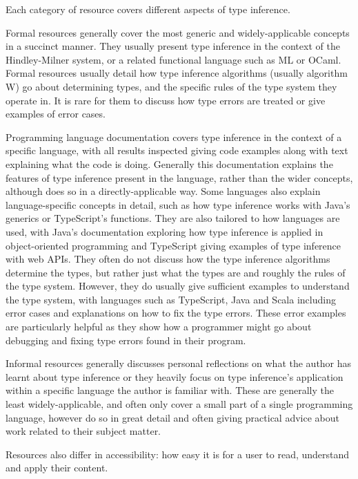 \documentclass[a4paper,fleqn,twoside,12pt]{report}
\begin{document}
Each category of resource covers different aspects of type inference.

Formal resources generally cover the most generic and widely-applicable concepts in a succinct manner. They usually present type inference in the context of the Hindley-Milner system, or a related functional language such as ML or OCaml. Formal resources usually detail how type inference algorithms (usually algorithm W) go about determining types, and the specific rules of the type system they operate in. It is rare for them to discuss how type errors are treated or give examples of error cases.

Programming language documentation covers type inference in the context of a specific language, with all results inspected giving code examples along with text explaining what the code is doing. Generally this documentation explains the features of type inference present in the language, rather than the wider concepts, although does so in a directly-applicable way. Some languages also explain language-specific concepts in detail, such as how type inference works with Java’s generics or TypeScript’s functions. They are also tailored to how languages are used, with Java’s documentation exploring how type inference is applied in object-oriented programming and TypeScript giving examples of type inference with web APIs. They often do not discuss how the type inference algorithms determine the types, but rather just what the types are and roughly the rules of the type system. However, they do usually give sufficient examples to understand the type system, with languages such as TypeScript, Java and Scala including error cases and explanations on how to fix the type errors. These error examples are particularly helpful as they show how a programmer might go about debugging and fixing type errors found in their program.

Informal resources generally discusses personal reflections on what the author has learnt about type inference or they heavily focus on type inference’s application within a specific language the author is familiar with. These are generally the least widely-applicable, and often only cover a small part of a single programming language, however do so in great detail and often giving practical advice about work related to their subject matter.

Resources also differ in accessibility: how easy it is for a user to read, understand and apply their content.
\end{document}
